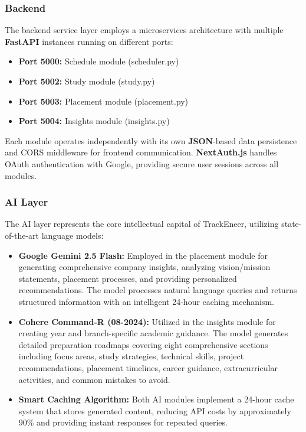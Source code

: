 \documentclass[12pt]{article}
\begin{document}
\subsubsection{Backend}
The backend service layer employs a microservices architecture with multiple \textbf{FastAPI} instances running on different ports:
\begin{itemize}
    \item \textbf{Port 5000:} Schedule module (scheduler.py)
    \item \textbf{Port 5002:} Study module (study.py)
    \item \textbf{Port 5003:} Placement module (placement.py)
    \item \textbf{Port 5004:} Insights module (insights.py)
\end{itemize}

Each module operates independently with its own \textbf{JSON}-based data persistence and CORS middleware for frontend communication. \textbf{NextAuth.js} handles OAuth authentication with Google, providing secure user sessions across all modules.

\subsubsection{AI Layer}
The AI layer represents the core intellectual capital of TrackEneer, utilizing state-of-the-art language models:
\begin{itemize}
    \item \textbf{Google Gemini 2.5 Flash:} Employed in the placement module for generating comprehensive company insights, analyzing vision/mission statements, placement processes, and providing personalized recommendations. The model processes natural language queries and returns structured information with an intelligent 24-hour caching mechanism.
    
    \item \textbf{Cohere Command-R (08-2024):} Utilized in the insights module for creating year and branch-specific academic guidance. The model generates detailed preparation roadmaps covering eight comprehensive sections including focus areas, study strategies, technical skills, project recommendations, placement timelines, career guidance, extracurricular activities, and common mistakes to avoid.
    
    \item \textbf{Smart Caching Algorithm:} Both AI modules implement a 24-hour cache system that stores generated content, reducing API costs by approximately 90\% and providing instant responses for repeated queries.
\end{itemize}
\end{document}
